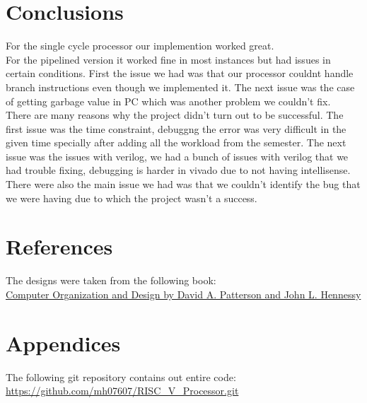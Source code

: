 \documentclass[a4paper, 12pt]{report}
\begin{document}
\section*{Conclusions}
For the single cycle processor our implemention worked great.
\\For the pipelined version it worked fine in most instances but had issues in certain conditions.
First the issue we had was that our processor couldnt handle branch instructions even though we implemented it. The next issue was the case of getting garbage value in PC which was another problem we couldn't fix.
\\There are many reasons why the project didn't turn out to be successful. The first issue was the time constraint, debuggng the error was very difficult in the given time specially after adding all the workload from the semester.
The next issue was the issues with verilog, we had a bunch of issues with verilog that we had trouble fixing, debugging is harder in vivado due to not having intellisense.
\\There were also the main issue we had was that we couldn't identify the bug that we were having due to which the project wasn't a success.
\section*{References}
The designs were taken from the following book:
\\\href{http://home.ustc.edu.cn/~louwenqi/reference_books_tools/Computer%20Organization%20and%20Design%20RISC-V%20edition.pdf}{Computer Organization and Design by David A. Patterson and John L. Hennessy}
\section*{Appendices}
The following git repository contains out entire code:
\href{https://github.com/mh07607/RISC_V_Processor.git}{https://github.com/mh07607/RISC_V_Processor.git}
\end{document}
